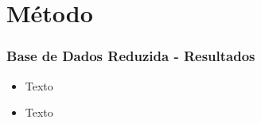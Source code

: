 \section{Método}
\begin{frame}
\frametitle{Base de Dados Reduzida - Resultados}
\justifying

\begin{itemize}
    \item  Texto
    \vspace{0.2cm}

    \item Texto
    \vspace{0.2cm}

\end{itemize}    
\end{frame}